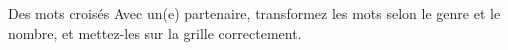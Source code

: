 \begin{frame}{Des mots croisés}
  Avec un(e) partenaire, transformez les mots selon le genre et le nombre, et mettez-les sur la grille correctement.
  \begin{center}
  \end{center}
\end{frame}